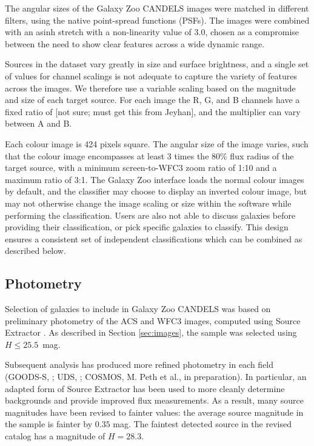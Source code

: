 \documentclass[useAMS,usenatbib]{mn2e}
\def\notebsm	{\color{titlecol}}
\begin{document}
{The angular sizes of the Galaxy Zoo CANDELS images were matched in different filters, using the native point-spread functions (PSFs). The images were combined with an asinh stretch \citep[described in detail in][]{lupton04} with a non-linearity value of {\notebsm 3.0}, chosen as a compromise between the need to show clear features across a wide dynamic range. 

Sources in the dataset vary greatly in size and surface brightness, and a single set of values for channel scalings is not adequate to capture the variety of features across the images. We therefore use a variable scaling based on the {\notebsm magnitude and size} of each target source. For each image the R, G, and B channels have a fixed ratio of {\notebsm [not sure; must get this from Jeyhan]}, and the multiplier can vary between {\notebsm A and B}. 

Each colour image is 424 pixels square. The angular size of the image varies, such that the colour image encompasses at least {\notebsm 3 times the 80\% flux radius of the target source}, with a minimum screen-to-WFC3 zoom ratio of {\notebsm 1:10} and a maximum ratio of {\notebsm 3:1}. The Galaxy Zoo interface loads the normal colour images by default, and the classifier may choose to display an inverted colour image, but may not otherwise change the image scaling or size within the software while performing the classification. Users are also not able to discuss galaxies before providing their classification, or pick specific galaxies to classify. This design ensures a consistent set of independent classifications which can be combined as described below.



\subsection{Photometry}

Selection of galaxies to include in Galaxy Zoo CANDELS was based on preliminary photometry of the ACS and WFC3 images, computed using Source Extractor \citep{bertin96}. As described in Section \ref{sec:images}, the sample was selected using $H \leq 25.5$~mag. 

Subsequent analysis has produced more refined photometry in each field (GOODS-S, \citeauthor{guo13} \citeyear{guo13}; UDS, \citeauthor{galametz13} \citeyear{galametz13}; COSMOS, M. Peth et al., in preparation). In particular, an adapted form of Source Extractor has been used to more cleanly determine backgrounds and provide improved flux measurements. As a result, many source magnitudes have been revised to fainter values: the average source magnitude in the sample is fainter by $0.35$ mag. The faintest detected source in the revised catalog has a magnitude of $H = 28.3$.

}
\end{document}
